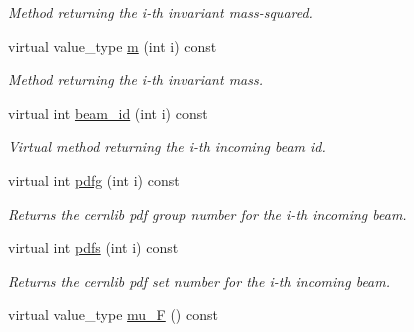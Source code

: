 \begin{DoxyCompactItemize}
\begin{DoxyCompactList}\small\item\em Method returning the i-\/th invariant mass-\/squared. \end{DoxyCompactList}\item 
\hypertarget{a00442_abdc1d4c568e4e3b815064c3d639ad913}{virtual value\-\_\-type \hyperlink{a00442_abdc1d4c568e4e3b815064c3d639ad913}{m} (int i) const }\label{a00442_abdc1d4c568e4e3b815064c3d639ad913}

\begin{DoxyCompactList}\small\item\em Method returning the i-\/th invariant mass. \end{DoxyCompactList}\item 
\hypertarget{a00442_ab846d190acfc2bc65f2634f74c4d792c}{virtual int \hyperlink{a00442_ab846d190acfc2bc65f2634f74c4d792c}{beam\-\_\-id} (int i) const }\label{a00442_ab846d190acfc2bc65f2634f74c4d792c}

\begin{DoxyCompactList}\small\item\em Virtual method returning the i-\/th incoming beam id. \end{DoxyCompactList}\item 
\hypertarget{a00442_a8ddbafb2ee3d95eb1ba96ca48f0f9a9f}{virtual int \hyperlink{a00442_a8ddbafb2ee3d95eb1ba96ca48f0f9a9f}{pdfg} (int i) const }\label{a00442_a8ddbafb2ee3d95eb1ba96ca48f0f9a9f}

\begin{DoxyCompactList}\small\item\em Returns the cernlib pdf group number for the i-\/th incoming beam. \end{DoxyCompactList}\item 
\hypertarget{a00442_a668f0471b0ad13245705972331dcddb7}{virtual int \hyperlink{a00442_a668f0471b0ad13245705972331dcddb7}{pdfs} (int i) const }\label{a00442_a668f0471b0ad13245705972331dcddb7}

\begin{DoxyCompactList}\small\item\em Returns the cernlib pdf set number for the i-\/th incoming beam. \end{DoxyCompactList}\item 
\hypertarget{a00442_a68a37fa41c44fffb61618320b84b2879}{virtual value\-\_\-type \hyperlink{a00442_a68a37fa41c44fffb61618320b84b2879}{mu\-\_\-\-F} () const }\label{a00442_a68a37fa41c44fffb61618320b84b2879}


\end{DoxyCompactItemize}

